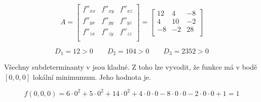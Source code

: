 \begin{displaymath}
A = \begin{bmatrix}
f''_{xx} & f''_{xy} &  f''_{xz}\\
f''_{yx} & f''_{yy} &  f''_{yz}\\
f''_{zx} & f''_{zy} &  f''_{zz}\\
\end{bmatrix}
=
\begin{bmatrix}
12 & 4 & -8\\
4 & 10 & -2\\
-8 & -2 & 28\\
\end{bmatrix}
\end{displaymath}

\begin{displaymath}
D_1 = 12 > 0 \qquad D_2 = 104 > 0 \qquad D_3 = 2352 > 0
\end{displaymath}

Všechny subdeterminanty v jsou kladné. Z toho lze vyvodit, že funkce má v bodě $[0, 0, 0]$ lokální minimumum. Jeho hodnota je.

\begin{displaymath}
f(0,0,0) = 6\cdot0^2 + 5\cdot0^2 + 14\cdot0^2 + 4\cdot0\cdot0 - 8\cdot0\cdot0 - 2\cdot0\cdot0 + 1 = 1
\end{displaymath}

